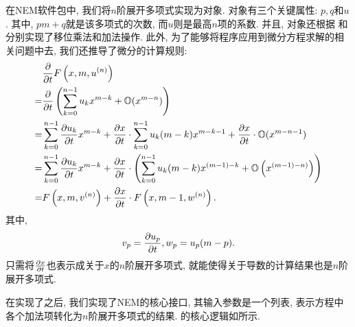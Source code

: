 在NEM软件包中, 我们将$n$阶展开多项式实现为对象. 对象有三个关键属性: $p,q$和$u$. 其中, $pm+q$就是该多项式的次数, 而$u$则是最高$n$项的系数. 并且, 对象还根据\D {} 和  分别实现了移位\D 乘法和加法操作. 此外, 为了能够将程序应用到微分方程求解的相关问题中去, 我们还推导了微分的计算规则:
\begin{equation}
\begin{split}
& \frac{\partial}{\partial t}F\left(x,m,u^{(n)}\right)  \\
=& \frac{\partial}{\partial t}\left(\sum_{k=0}^{n-1}{u_k x^{m-k}}+\mathbb O(x^{m-n})\right) \\
=& \sum_{k=0}^{n-1}{\frac{\partial u_k}{\partial t}x^{m-k}}+\frac{\partial x}{\partial t}\cdot\sum_{k=0}^{n-1}{u_k (m-k) x^{m-k-1}}+\frac{\partial x}{\partial t}\cdot\mathbb O(x^{m-n-1}) \\
=& \sum_{k=0}^{n-1}{\frac{\partial u_k}{\partial t}x^{m-k}}+\frac{\partial x}{\partial t}\cdot\left(\sum_{k=0}^{n-1}{u_k (m-k) x^{(m-1)-k}}+\mathbb O\left(x^{(m-1)-n)}\right)\right) \\ 
=& F\left(x,m,v^{(n)}\right)+\frac{\partial x}{\partial t}\cdot F\left(x,m-1,w^{(n)}\right).
\end{split}\label{NEM-diff}
\end{equation}
其中, 
\begin{equation}
v_p=\frac{\partial u_p}{\partial t}, w_p=u_p(m-p).
\end{equation}
只需将$\frac{\partial x}{\partial t}$也表示成关于$x$的$n$阶展开多项式, 就能使得关于导数的计算结果也是$n$阶展开多项式. 

在实现了之后, 我们实现了NEM的核心接口, 其输入参数是一个列表, 表示方程中各个加法项转化为$n$阶展开多项式的结果. 的核心逻辑如所示. 

